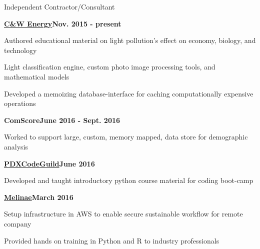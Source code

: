 \documentclass{article}
\newenvironment{**mylist}[2]{
  \subsubsection*{#1\hfill\small#2}
  \small
  \begin{list}{}{}
   \setlength{\topsep}{0pt}
   \setlength{\itemsep}{1pt}
   \setlength{\parskip}{0pt}
   \setlength{\parsep}{0pt}}{\end{list}\normalsize}
\newcommand{\LU}[1]{\hspace{-1em}{\bf Languages Used : #1}}
\begin{document}
\begin{**mylist}{Independent \tabb Contractor/Consultant}{}
\item \hspace{-1em}
  \href{http://cwenergyusa.com/star-friendly/}{\bf{C\&W Energy}}\hfill{\bf{Nov. 2015 - present}}
\item Authored educational material on light pollution's effect on economy, biology, and technology
\item Light classification engine, custom photo image processing tools, and mathematical models
\item Developed a memoizing database-interface for caching computationally expensive operations
\item \hspace{-1em}
  {\bf{ComScore}}\hfill{\bf{June 2016 - Sept. 2016}}
\item Worked to support large, custom, memory mapped, data store for demographic analysis
\item \hspace{-1em}
  \href{http://pdxcodeguild.com/}{\bf{PDXCodeGuild}}\hfill{\bf{June 2016}}
\item Developed and taught introductory python course material for coding boot-camp
\item \hspace{-1em}
  \href{http://www.melinae.com/}{\bf{Melinae}}\hfill{\bf{March 2016}}
\item Setup infrastructure in AWS to enable secure sustainable workflow for remote company
\item Provided hands on training in Python and R to industry professionals
\item \LU{Python, R, AWS, PostgreSQL, Perl, C++}
\end{**mylist}

\begin{comment}
\vspace{2em}
       {\center {\em\footnotesize continued...}\par}
\end{comment}
\end{document}
